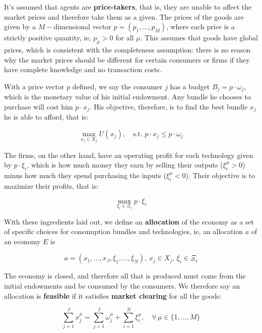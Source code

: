 It's assumed that agents are \textbf{price-takers}, that is, they are
unable to affect the market prices and therefore take them as a
given. The prices of the goods are given by a $M-$dimensional vector
$p = (p_1, \ldots, p_M)$, where each price is a strictly positive
quantity, ie, $p_\mu>0$ for all $\mu$. This assumes that goods have global
prices, which is consistent with the completeness assumption: there is
no reason why the market prices should be different for certain
consumers or firms if they have complete knowledge and no transaction
costs.

With a price vector $p$ defined, we say the consumer $j$ has a budget
$B_j = p\cdot \omega_j$, which is the monetary value of his initial
endowment. Any bundle he chooses to purchase will cost him
$p\cdot x_j$. His objective, therefore, is to find the best bundle
$x_j$ he is able to afford, that is:

\begin{equation}
  \label{eq:consumer_obj}
  \max_{x_j \in X_j} U(x_j), \quad \text{s.t. } p\cdot x_j \leq p\cdot \omega_j
\end{equation}

The firms, on the other hand, have an operating profit for each
technology given by $p \cdot \xi_i$, which is how much money they earn
by selling their outputs ($\xi_i^\mu > 0$) minus how much they spend
purchasing the inputs ($\xi_i^\mu < 0$). Their objective is to maximize
their profits, that is:

\begin{equation}
  \label{eq:firm_obj}
  \max_{\xi_i \in \Xi_i} p \cdot \xi_i
\end{equation}

With these ingredients laid out, we define an \textbf{allocation} of the
economy as a set of specific choices for consumption bundles and
technologies, ie, an allocation $a$ of an economy $E$ is

\begin{equation}
  \label{eq:3}
  a = (x_1, \ldots, x_J, \xi_1, \ldots, \xi_N), \, x_j \in X_j, \,
  \xi_i \in \Xi_i
\end{equation}

The economy is closed, and therefore all that is produced must come
from the initial endowments and be consumed by the consumers. We
therefore say an allocation is \textbf{feasible} if it satisfies
\textbf{market clearing} for all the goods:

\begin{equation}
  \label{eq:market_clearing}
  \sum_{j=1}^J x^\mu_j = \sum_{j=1}^J \omega_j^\mu + \sum_{i=1}^N
  \xi_i^\mu, \quad \forall \, \mu \in \{1,\ldots, M\}
\end{equation}

